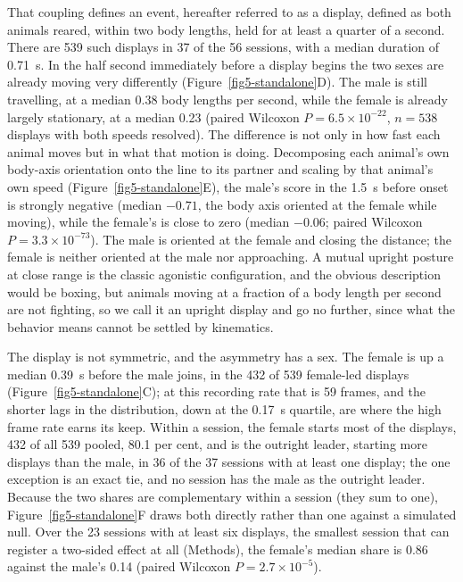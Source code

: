 \documentclass[11pt]{article}
\begin{document}
That coupling defines an event, hereafter referred to as a display, defined as both animals reared, within two body lengths, held for at least a quarter of a second. There are 539 such displays in 37 of the 56 sessions, with a median duration of 0.71~s. In the half second immediately before a display begins the two sexes are already moving very differently (Figure~\ref{fig5-standalone}D). The male is still travelling, at a median 0.38 body lengths per second, while the female is already largely stationary, at a median 0.23 (paired Wilcoxon $P = 6.5 \times 10^{-22}$, $n = 538$ displays with both speeds resolved). The difference is not only in how fast each animal moves but in what that motion is doing. Decomposing each animal's own body-axis orientation onto the line to its partner and scaling by that animal's own speed (Figure~\ref{fig5-standalone}E), the male's score in the 1.5~s before onset is strongly negative (median $-0.71$, the body axis oriented at the female while moving), while the female's is close to zero (median $-0.06$; paired Wilcoxon $P = 3.3 \times 10^{-73}$). The male is oriented at the female and closing the distance; the female is neither oriented at the male nor approaching. A mutual upright posture at close range is the classic agonistic configuration, and the obvious description would be boxing, but animals moving at a fraction of a body length per second are not fighting, so we call it an upright display and go no further, since what the behavior means cannot be settled by kinematics.

The display is not symmetric, and the asymmetry has a sex. The female is up a median 0.39~s before the male joins, in the 432 of 539 female-led displays (Figure~\ref{fig5-standalone}C); at this recording rate that is 59 frames, and the shorter lags in the distribution, down at the 0.17~s quartile, are where the high frame rate earns its keep. Within a session, the female starts most of the displays, 432 of all 539 pooled, 80.1 per cent, and is the outright leader, starting more displays than the male, in 36 of the 37 sessions with at least one display; the one exception is an exact tie, and no session has the male as the outright leader. Because the two shares are complementary within a session (they sum to one), Figure~\ref{fig5-standalone}F draws both directly rather than one against a simulated null. Over the 23 sessions with at least six displays, the smallest session that can register a two-sided effect at all (Methods), the female's median share is 0.86 against the male's 0.14 (paired Wilcoxon $P = 2.7 \times 10^{-5}$).
\end{document}
